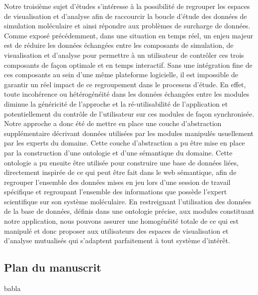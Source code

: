 Notre troisième sujet d'études s'intéresse à la possibilité de regrouper les espaces de visualisation et d'analyse afin de raccourcir la boucle d'étude des données de simulation moléculaire et ainsi répondre aux problèmes de surcharge de données. Comme exposé précédemment, dans une situation en temps réel, un enjeu majeur est de réduire les données échangées entre les composants de simulation, de visualisation et d'analyse pour permettre à un utilisateur de contrôler ces trois composants de façon optimale et en temps interactif. Sans une intégration fine de ces composants au sein d'une même plateforme logicielle, il est impossible de garantir un réel impact de ce regroupement dans le processus d'étude. En effet, toute incohérence ou hétérogénéité dans les données échangées entre les modules diminue la généricité de l'approche et la ré-utilisabilité de l'application et potentiellement du contrôle de l'utilisateur sur ces modules de façon synchronisée. Notre approche a donc été de mettre en place une couche d'abstraction supplémentaire décrivant données utilisées par les modules manipulés usuellement par les experts du domaine. Cette couche d'abstraction a pu être mise en place par la construction d'une ontologie et d'une sémantique du domaine. Cette ontologie a pu ensuite être utilisée pour construire une base de données liées, directement inspirée de ce qui peut être fait dans le web sémantique, afin de regrouper l'ensemble des données mises en jeu lors d'une session de travail spécifique et regroupant l'ensemble des informations que possède l'expert scientifique sur son système moléculaire. En restreignant l'utilisation des données de la base de données, définis dans une ontologie précise, aux modules constituant notre application, nous pouvons assurer une homogénéité totale de ce qui est manipulé et donc proposer aux utilisateurs des espaces de visualisation et d'analyse mutualisés qui s'adaptent parfaitement à tout système d’intérêt.




\subsection*{Plan du manuscrit}


babla